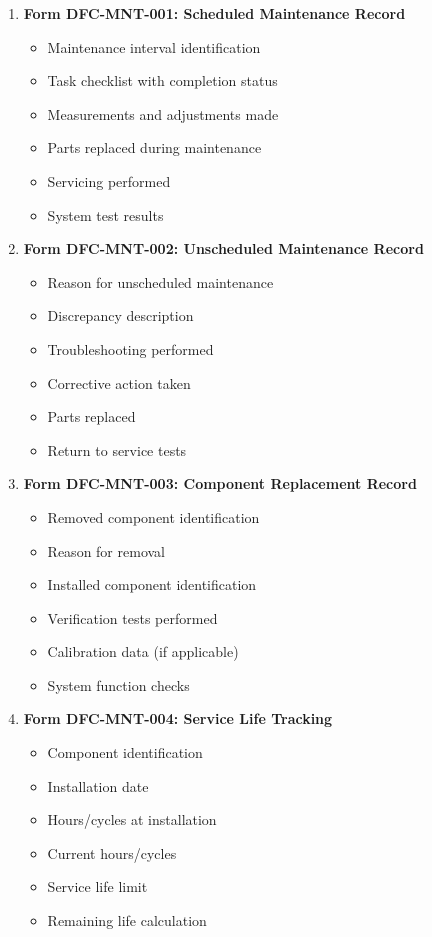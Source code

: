 \documentclass[12pt,a4paper,twoside,openright]{book}
\begin{document}
\begin{enumerate}
    \item \textbf{Form DFC-MNT-001: Scheduled Maintenance Record}
    \begin{itemize}
        \item Maintenance interval identification
        \item Task checklist with completion status
        \item Measurements and adjustments made
        \item Parts replaced during maintenance
        \item Servicing performed
        \item System test results
    \end{itemize}
    
    \item \textbf{Form DFC-MNT-002: Unscheduled Maintenance Record}
    \begin{itemize}
        \item Reason for unscheduled maintenance
        \item Discrepancy description
        \item Troubleshooting performed
        \item Corrective action taken
        \item Parts replaced
        \item Return to service tests
    \end{itemize}
    
    \item \textbf{Form DFC-MNT-003: Component Replacement Record}
    \begin{itemize}
        \item Removed component identification
        \item Reason for removal
        \item Installed component identification
        \item Verification tests performed
        \item Calibration data (if applicable)
        \item System function checks
    \end{itemize}
    
    \item \textbf{Form DFC-MNT-004: Service Life Tracking}
    \begin{itemize}
        \item Component identification
        \item Installation date
        \item Hours/cycles at installation
        \item Current hours/cycles
        \item Service life limit
        \item Remaining life calculation
    \end{itemize}
\end{enumerate}
\end{document}
